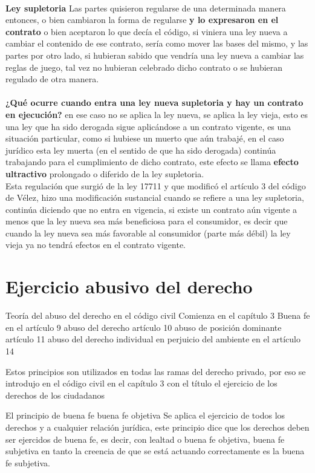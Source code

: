 \documentclass[12pt]{book}
\begin{document}
\\
\textbf{Ley supletoria}
Las partes quisieron regularse de una determinada manera entonces, o bien cambiaron la forma de regularse \textbf{y lo expresaron en el contrato} o bien aceptaron lo que decía el código, si viniera una ley nueva a cambiar el contenido de ese contrato, sería como mover las bases del mismo, y las partes por otro lado, si hubieran sabido que vendría una ley nueva a cambiar las reglas de juego, tal vez no hubieran celebrado dicho contrato o se hubieran regulado de otra manera.
\\ \\
\textbf{¿Qué ocurre cuando entra una ley nueva supletoria y hay un contrato en ejecución? }
en ese caso no se aplica la ley nueva, se aplica la ley vieja, esto es una ley que ha sido derogada sigue aplicándose a un contrato vigente, es una situación particular, como si hubiese un muerto que aún trabajé, en el caso jurídico esta ley muerta (en el sentido de que ha sido derogada) continúa trabajando para el cumplimiento de dicho contrato, este efecto se llama \textbf{efecto ultractivo} prolongado o diferido de la ley supletoria.
\\
Esta regulación que surgió de la ley 17711 y que modificó el artículo 3 del código de Vélez, 
hizo una modificación sustancial  cuando se refiere a una ley supletoria, continúa diciendo que no entra en vigencia, si existe un contrato aún vigente a menos que la ley nueva sea más beneficiosa para el consumidor, es decir que cuando la ley nueva sea más favorable al consumidor (parte m\'as d\'ebil) la ley vieja ya no tendrá efectos en el contrato vigente.





\chapter{Ejercicio abusivo del derecho}

Teoría del abuso del derecho en el código civil Comienza en el capítulo 3 
Buena fe en el artículo 9 abuso del derecho artículo 10 abuso de posición dominante artículo 11 abuso del derecho individual en perjuicio del ambiente en el artículo 14 

Estos principios son utilizados en todas las ramas del derecho privado, por eso se introdujo en el código civil en el capítulo 3 con el título el ejercicio de los derechos de los ciudadanos 

El principio de buena fe
buena fe objetiva
Se aplica el ejercicio de todos los derechos y a cualquier relación jurídica, este principio dice que los derechos deben ser ejercidos de buena fe, es decir, con lealtad o buena fe objetiva, 
buena fe subjetiva
en tanto la creencia de que se está actuando correctamente es la buena fe subjetiva.
\end{document}
